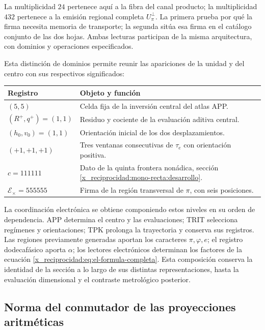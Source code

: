 La multiplicidad \(24\) pertenece aquí a la fibra del canal producto;
la multiplicidad \(432\) pertenece a la emisión regional completa
\(U_\pi^\perp\). La primera prueba por qué la firma necesita memoria
de transporte; la segunda sitúa esa firma en el catálogo conjunto de
las dos hojas. Ambas lecturas participan de la misma arquitectura,
con dominios y operaciones especificados.

Esta distinción de dominios permite reunir las apariciones de la unidad
y del centro con sus respectivos significados:
\begin{center}
\small
\begin{tabularx}{\textwidth}{@{}lX@{}}
\toprule
Registro & Objeto y función \\
\midrule
\((5,5)\) & Celda fija de la inversión central del atlas APP.\\
\((R^+,q^+)=(1,1)\) & Residuo y cociente de la evaluación aditiva central.\\
\((h_0,v_0)=(1,1)\) & Orientación inicial de los dos desplazamientos.\\
\((+1,+1,+1)\) & Tres ventanas consecutivas de \(\tau_e\) con orientación positiva.\\
\(c=111111\) & Dato de la quinta frontera nonádica, sección \ref{x_reciprocidad:mono-recta:desarrollo}.\\
\(\mathcal E_\times=555555\) & Firma de la región transversal de \(\pi\), con seis posiciones.\\
\bottomrule
\end{tabularx}
\end{center}

La coordinación electrónica se obtiene componiendo estos niveles en su
orden de dependencia. APP determina el centro y las evaluaciones;
TRIT selecciona regímenes y orientaciones; TPK prolonga la trayectoria
y conserva sus registros. Las regiones previamente generadas aportan
los caracteres \(\pi,\varphi,e\); el registro dodecafásico aporta
\(\alpha\); los lectores electrónicos determinan los factores de
la ecuación \eqref{x_reciprocidad:eq:el-formula-completa}. Esta composición conserva
la identidad de la sección a lo largo de sus distintas
representaciones, hasta la evaluación dimensional y el contraste
metrológico posterior.



\subsection{Norma del conmutador de las proyecciones aritméticas}

